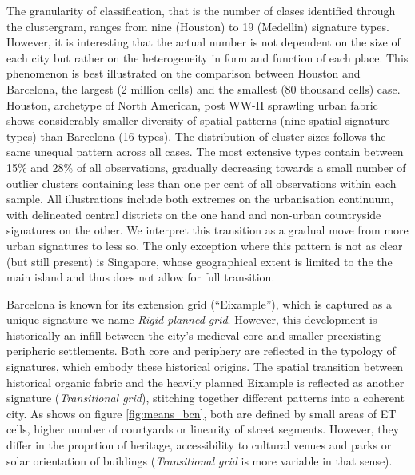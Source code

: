The granularity of classification, that is the number of clases identified
through the clustergram, ranges from nine (Houston) to 19 (Medellin) signature
types. However, it is interesting that the actual number is not dependent on the size of each
city but rather on the heterogeneity in form and function of each place. This
phenomenon is best illustrated on the comparison
between Houston and Barcelona, the largest (2 million cells) and the smallest (80 thousand
cells) case. Houston, archetype of North American, post WW-II sprawling urban fabric shows
considerably smaller diversity of spatial patterns (nine spatial signature
types) than
Barcelona (16 types).
The distribution of cluster sizes follows the same unequal pattern across
all cases. The most extensive types contain between 15\% and 28\% of all
observations, gradually decreasing towards a small number of
outlier clusters containing less than one per cent of all observations within each sample.
All illustrations include both extremes on the urbanisation continuum, with delineated
central districts on the one hand and non-urban countryside signatures on the
other. We interpret this
transition as a gradual move from more urban signatures to less so. The only
exception where this pattern is not as clear (but
still present) is Singapore, whose geographical extent is limited to the
the main island and thus does not allow for full transition.

Barcelona is known for its extension grid (``Eixample''), which is captured as
a unique signature we name \textit{Rigid planned grid}.
However, this development is historically an infill between the city's medieval core and
smaller preexisting peripheric settlements. Both core and periphery are
reflected in the typology of signatures, which embody these historical
origins. The spatial transition between historical organic fabric and the
heavily planned Eixample is reflected as another signature (\textit{Transitional grid}),
stitching together different patterns into a coherent city. As shows on figure \ref{fig:means_bcn},
both are defined by small areas of ET cells, higher number of courtyards or linearity of
street segments. However, they differ in the proprtion of heritage, accessibility to cultural venues and parks or
solar orientation of buildings (\textit{Transitional grid} is more variable in that sense).

